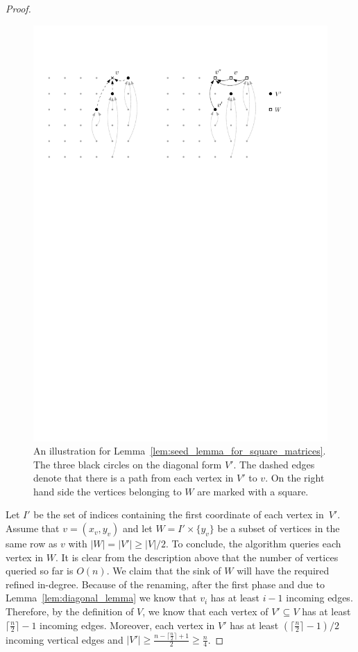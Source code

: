 \documentclass[runningheads,a4paper]{llncs}
\newcommand{\indegree}{refined in-degree\xspace}
\begin{document}
\begin{proof}
\begin{figure}[htbp] 
\centering
\includegraphics[scale=0.7]{seedlemma_fig1.pdf}
\caption{\small An illustration for Lemma~\ref{lem:seed_lemma_for_square_matrices}. The three black circles on the diagonal form $V'$. The dashed edges denote that there is a path from each vertex in $V'$ to $v$. On the right hand side the vertices belonging to $W$ are marked with a square. }
\label{fig:seedlem1}
\end{figure}

Let $I'$ be the set of indices containing the first coordinate of each vertex in~$V'$. 
Assume that $v = (x_v, y_v)$ and let $W = I'\times \{y_v\}$ be a subset of vertices in the same row as $v$ with $|W| = |V'|\geq |V|/2$.
To conclude, the algorithm queries each vertex in $W$.
It is clear from the description above that the number of vertices queried so far is $O(n)$. 
We claim that the sink of $W$ will have the required \indegree.
Because of the renaming, after the first phase and due to Lemma~\ref{lem:diagonal_lemma} we know that $v_i$ has at least $i-1$ incoming edges. 
Therefore, by the definition of $V$, we know that each vertex of $V'\subseteq V$ has at least $\lceil \frac{n}{2} \rceil - 1$ incoming edges.
Moreover, each vertex in $V'$ has at least $(\lceil \frac{n}{2}\rceil-1)/2$ incoming vertical edges and $|V'| \geq \frac{n-\lceil \frac{n}{2}\rceil + 1}{2} \geq \frac{n}{4}$. 


\end{proof}
\end{document}

